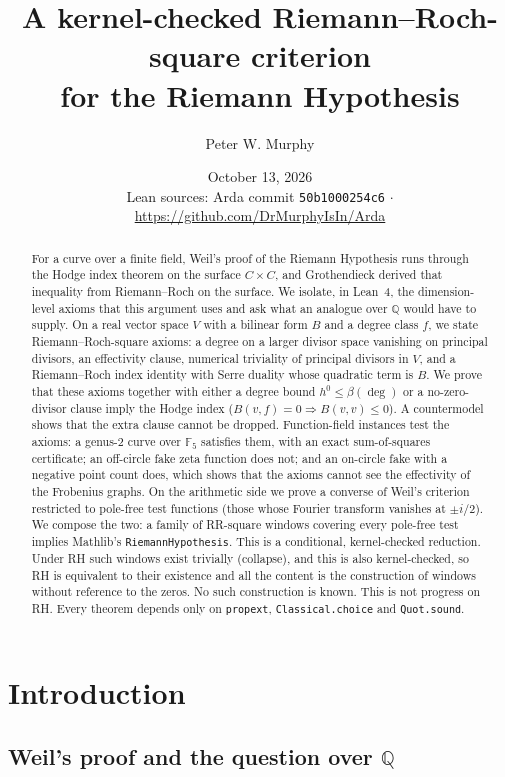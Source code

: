 \documentclass[11pt]{article}
\title{A kernel-checked Riemann--Roch-square criterion\\ for the Riemann Hypothesis}
\author{Peter W. Murphy}
\date{October 13, 2026\\[2pt] \small Lean sources: Arda commit \texttt{50b1000254c6} \;$\cdot$\; \url{https://github.com/DrMurphyIsIn/Arda}}
\theoremstyle{definition}
\newcommand{\Q}{\mathbb{Q}}
\newcommand{\F}{\mathbb{F}}
\begin{document}
\maketitle

\begin{abstract}
For a curve over a finite field, Weil's proof of the Riemann Hypothesis runs through the Hodge index theorem on the surface $C \times C$, and Grothendieck derived that inequality from Riemann--Roch on the surface. We isolate, in Lean~4, the dimension-level axioms that this argument uses and ask what an analogue over $\Q$ would have to supply. On a real vector space $V$ with a bilinear form $B$ and a degree class $f$, we state Riemann--Roch-square axioms: a degree on a larger divisor space vanishing on principal divisors, an effectivity clause, numerical triviality of principal divisors in $V$, and a Riemann--Roch index identity with Serre duality whose quadratic term is $B$. We prove that these axioms together with either a degree bound $h^0 \le \beta(\deg)$ or a no-zero-divisor clause imply the Hodge index ($B(v,f) = 0 \Rightarrow B(v,v) \le 0$). A countermodel shows that the extra clause cannot be dropped. Function-field instances test the axioms: a genus-2 curve over $\F_5$ satisfies them, with an exact sum-of-squares certificate; an off-circle fake zeta function does not; and an on-circle fake with a negative point count does, which shows that the axioms cannot see the effectivity of the Frobenius graphs. On the arithmetic side we prove a converse of Weil's criterion restricted to pole-free test functions (those whose Fourier transform vanishes at $\pm i/2$). We compose the two: a family of RR-square windows covering every pole-free test implies Mathlib's \texttt{RiemannHypothesis}. This is a conditional, kernel-checked reduction. Under RH such windows exist trivially (collapse), and this is also kernel-checked, so RH is equivalent to their existence and all the content is the construction of windows without reference to the zeros. No such construction is known. This is not progress on RH. Every theorem depends only on \texttt{propext}, \texttt{Classical.choice} and \texttt{Quot.sound}.
\end{abstract}

\section{Introduction}\label{sec:intro}

\subsection{Weil's proof and the question over \texorpdfstring{$\Q$}{Q}}
\end{document}
